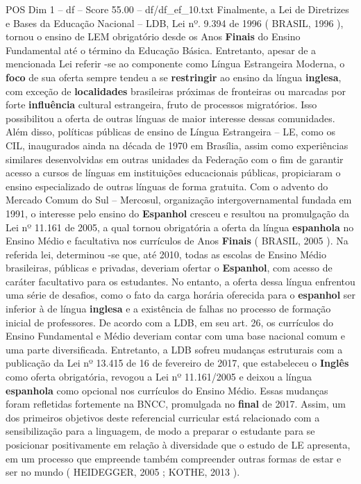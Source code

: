 \begin{textsample}{POS Dim 1 – df – Score 55.00 – df/df\_ef\_10.txt}
Finalmente, a Lei de Diretrizes e Bases da Educação Nacional – LDB, Lei nº. 9.394 de 1996 ( BRASIL, 1996 ), tornou o ensino de LEM obrigatório desde os Anos \textbf{Finais} do Ensino Fundamental até o término da Educação Básica.
Entretanto, apesar de a mencionada Lei referir -se ao componente como Língua Estrangeira Moderna, o \textbf{foco} de sua oferta sempre tendeu a se \textbf{restringir} ao ensino da língua \textbf{inglesa}, com exceção de \textbf{localidades} brasileiras próximas de fronteiras ou marcadas por forte \textbf{influência} cultural estrangeira, fruto de processos migratórios.
Isso possibilitou a oferta de outras línguas de maior interesse dessas comunidades.
Além disso, políticas públicas de ensino de Língua Estrangeira – LE, como os CIL, inaugurados ainda na década de 1970 em Brasília, assim como experiências similares desenvolvidas em outras unidades da Federação com o fim de garantir acesso a cursos de línguas em instituições educacionais públicas, propiciaram o ensino especializado de outras línguas de forma gratuita.
Com o advento do Mercado Comum do Sul – Mercosul, organização intergovernamental fundada em 1991, o interesse pelo ensino do \textbf{Espanhol} cresceu e resultou na promulgação da Lei nº 11.161 de 2005, a qual tornou obrigatória a oferta da língua \textbf{espanhola} no Ensino Médio e facultativa nos currículos de Anos \textbf{Finais} ( BRASIL, 2005 ).
Na referida lei, determinou -se que, até 2010, todas as escolas de Ensino Médio brasileiras, públicas e privadas, deveriam ofertar o \textbf{Espanhol}, com acesso de caráter facultativo para os estudantes.
No entanto, a oferta dessa língua enfrentou uma série de desafios, como o fato da carga horária oferecida para o \textbf{espanhol} ser inferior à de língua \textbf{inglesa} e a existência de falhas no processo de formação inicial de professores.
De acordo com a LDB, em seu art. 26, os currículos do Ensino Fundamental e Médio deveriam contar com uma base nacional comum e uma parte diversificada.
Entretanto, a LDB sofreu mudanças estruturais com a publicação da Lei nº 13.415 de 16 de fevereiro de 2017, que estabeleceu o \textbf{Inglês} como oferta obrigatória, revogou a Lei nº 11.161/2005 e deixou a língua \textbf{espanhola} como opcional nos currículos do Ensino Médio.
Essas mudanças foram refletidas fortemente na BNCC, promulgada no \textbf{final} de 2017.
Assim, um dos primeiros objetivos deste referencial curricular está relacionado com a sensibilização para a linguagem, de modo a preparar o estudante para se posicionar positivamente em relação à diversidade que o estudo de LE apresenta, em um processo que empreende também compreender outras formas de estar e ser no mundo ( HEIDEGGER, 2005 ; KOTHE, 2013 ).

\end{textsample}
